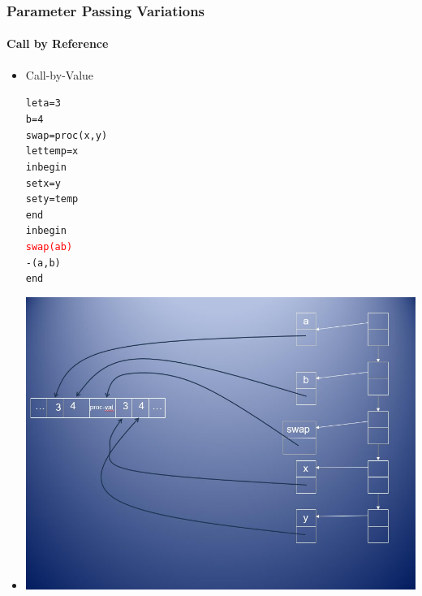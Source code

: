 \documentclass{beamer}
\begin{document}
\begin{frame}[fragile]
\frametitle{Parameter Passing Variations}
\framesubtitle{Call by Reference}
\begin{scriptsize}
\begin{itemize}
\item<1-> Call-by-Value
\begin{alltt}
\begin{tiny}
let a = 3
    b = 4
    swap = proc (x, y)
	        let temp = x
	        in begin
	             set x = y
	             set y = temp
	           end
in begin
     \textcolor{red}{swap(a b)}
     -(a, b)
   end
\end{tiny}
\end{alltt}

\item<1->
\begin{center}
\includegraphics[scale=0.35]{cbv-cbr2.jpg}
\end{center}

\end{itemize}
\end{scriptsize}
\end{frame}
\end{document}
